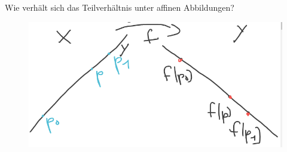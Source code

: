 \begin{frage*}
    Wie verhält sich das Teilverhältnis unter affinen Abbildungen?
    \begin{figure}[H]
        \centering
        \includegraphics[width=0.7\linewidth]{figures/affine_abbildungen_wirkung_auf_teilverhaeltnis}
        \label{fig:affine_abbildungen_wirkung_auf_teilverhaeltnis}
    \end{figure}
    
\end{frage*}

